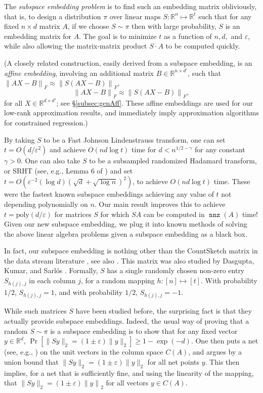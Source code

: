 \documentclass{sig-alternate}
\newcommand{\norm}[1]{{\| #1 \|}}
\DeclareMathOperator{\nnz}{\mathtt{nnz}}
\newcommand{\poly}{{\mathrm{poly}}}
\newcommand{\eps}{\varepsilon}
\newcommand{\R}{{\mathbb R}}
\begin{document}
The \emph{subspace embedding problem} is to find such an embedding matrix obliviously, that is,
 to design a distribution $\pi$ over linear maps $S:\R^n\mapsto\R^t$ such that for any
 fixed $n \times d$ matrix $A$, if we choose $S \sim \pi$ then with large probability,
 $S$ is an embedding matrix for $A$. The goal is to minimize
$t$ as a function of $n, d,$ and $\eps$, while also allowing the matrix-matrix product
$S \cdot A$ to be computed quickly.

(A closely related construction, easily derived from a subspace embedding,
is an \emph{affine embedding}, involving an additional matrix $B\in\R^{n\times d'}$,
such that
\ifSTOC
$\norm{AX-B}_F\approx \norm{S(AX-B)}_F$,
\else
\[\norm{AX-B}_F\approx \norm{S(AX-B)}_F,\]
\fi
for all $X\in\R^{d\times d'}$;
see \S\ref{subsec:genAff}. These affine embeddings are used for our low-rank
approximation results, and immediately imply approximation algorithms
for constrained regression.)

By taking $S$ to be a Fast Johnson Lindenstrauss transform, one can set $t = O(d/\eps^2)$ and achieve $O(nd \log t)$ time
for $d < n^{1/2-\gamma}$ for any constant $\gamma > 0$. One can also take $S$ to be a subsampled randomized Hadamard transform, or SRHT
(see, e.g., Lemma 6 of \cite{BG}) and set $t = O(\eps^{-2} (\log d)(\sqrt{d}+\sqrt{\log n})^2)$,
to achieve $O(nd \log t)$ time.
These were the fastest known subspace embeddings achieving any value of $t$
not depending polynomially on $n$. Our main result improves this to achieve $t= \poly(d/\eps)$ for matrices $S$
for which $SA$ can be computed in $\nnz(A)$ time! Given our new subspace embedding, we plug it into known methods of solving
the above linear algebra problems given a subspace embedding as a black box.

In fact, our subspace embedding is nothing other than the {\sf CountSketch} matrix in the data stream literature \cite{ccf04}, see also
\cite{tz04}. This matrix was also studied by Dasgupta, Kumar, and Sarl\'os \cite{dks10}. Formally, $S$ has a single randomly chosen non-zero
entry $S_{h(j), j}$ in each column $j$, for a random mapping $h : [n] \mapsto [t]$.
With probability $1/2$, $S_{h(j), j} = 1$, and with probability $1/2$, $S_{h(j), j} = -1$. 


While such matrices $S$ have been studied before, the surprising fact is that they actually provide subspace embeddings.
Indeed, the usual way of proving that a random $S \sim \pi$ is a subspace embedding is to show that for any fixed vector $y \in \mathbb{R}^d$,
$\Pr[\|Sy\|_2 = (1 \pm \eps) \|y\|_2] \geq 1-\exp(-d)$. One then puts a net (see, e.g., \cite{ahk06}) on the unit vectors in the column
space  $C(A)$, and argues by a union bound that $\|Sy\|_2 = (1 \pm \eps)\|y\|_2$ for all net points $y$. This then implies, for a net that
is sufficiently fine, and using the linearity of the mapping, 
that $\|Sy\|_2 = (1 \pm \eps)\norm{y}_2$ for all vectors $y\in C(A)$. 
\end{document}
